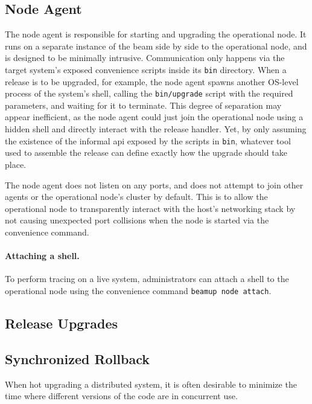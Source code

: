 \subsection{Node Agent}
The node agent is responsible for starting and upgrading the operational node. It runs on a separate instance of the \acrshort{beam} side by side to the operational node, and is designed to be minimally intrusive. Communication only happens via the target system's exposed convenience scripts inside its \lstinline|bin| directory. When a release is to be upgraded, for example, the node agent spawns another OS-level process of the system's shell, calling the \lstinline|bin/upgrade| script with the required parameters, and waiting for it to terminate. This
degree of separation may appear inefficient, as the node agent could just join the operational node using a hidden shell and directly interact with the release handler. Yet, by only assuming the existence of the informal \acrshort{api} exposed by the scripts in \lstinline|bin|, whatever tool used to assemble the release can define exactly how the upgrade should take place.



The node agent does not listen on any ports, and does not attempt to join other agents or the operational node's cluster by default. This is to allow the operational node to transparently interact with the host's networking stack by not causing unexpected port collisions when the node is started via the convenience command.


\paragraph{Attaching a shell.}
To perform tracing on a live system, administrators can attach a shell to the operational node using the convenience command \lstinline|beamup node attach|. 


\subsection{Release Upgrades}

\subsection{Synchronized Rollback}
When hot upgrading a distributed system, it is often desirable to minimize the time where different versions of the code are in concurrent use.
